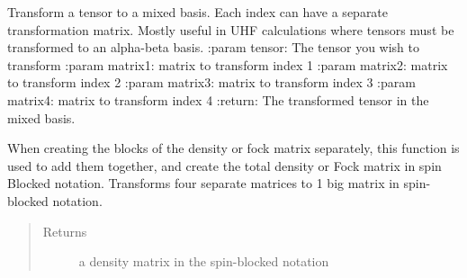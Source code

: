 \documentclass[letterpaper,10pt,english]{sphinxmanual}
\begin{document}

\begin{fulllineitems}
\label{\detokenize{transform:hf.utilities.transform.mix_tensor_to_basis_transform}}
Transform a tensor to a mixed basis. Each index can have a separate transformation matrix.
Mostly useful in UHF calculations where tensors must be transformed to an alpha-beta basis.
:param tensor: The tensor you wish to transform
:param matrix1: matrix to transform index 1
:param matrix2: matrix to transform index 2
:param matrix3: matrix to transform index 3
:param matrix4: matrix to transform index 4
:return: The transformed tensor in the mixed basis.

\end{fulllineitems}


\begin{fulllineitems}
\label{\detokenize{transform:hf.utilities.transform.spin_blocked}}
When creating the blocks of the density or fock matrix separately, this function is used to add them together,
and create the total density or Fock matrix in spin Blocked notation. Transforms four separate matrices to 1 big
matrix in spin-blocked notation.
\begin{quote}\begin{description}
\item[{Returns}] \leavevmode
a density matrix in the spin-blocked notation

\end{description}\end{quote}

\end{fulllineitems}

\end{document}
